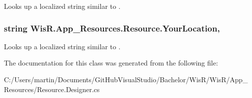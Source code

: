 Looks up a localized string similar to . 

\hypertarget{class_wis_r_1_1_app___resources_1_1_resource_a88d257b40e35629d310c7f0314550b1a}{}
\subsubsection[{Your\+Location}]{\setlength{\rightskip}{0pt plus 5cm}string Wis\+R.\+App\+\_\+\+Resources.\+Resource.\+Your\+Location\hspace{0.3cm}{\ttfamily [static]}, {\ttfamily [get]}}\label{class_wis_r_1_1_app___resources_1_1_resource_a88d257b40e35629d310c7f0314550b1a}


Looks up a localized string similar to . 



The documentation for this class was generated from the following file\+:\begin{DoxyCompactItemize}
\item 
C\+:/\+Users/martin/\+Documents/\+Git\+Hub\+Visual\+Studio/\+Bachelor/\+Wis\+R/\+Wis\+R/\+App\+\_\+\+Resources/Resource.\+Designer.\+cs\end{DoxyCompactItemize}
